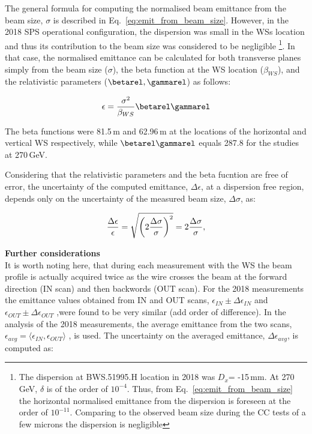 The general formula for computing the normalised beam emittance from the beam size, $\sigma$ is described in Eq.~\eqref{eq:emit_from_beam_size}. However, in the 2018 SPS operational configuration, the dispersion was small in the WSs location and thus its contribution to the beam size was considered to be negligible \footnote{The dispersion at BWS.51995.H location in 2018 was $D_x$= -15\,mm. At 270\,GeV, $\delta$ is of the order of $\mathrm{10^{-4}}$. Thus, from Eq.~\eqref{eq:emit_from_beam_size} the horizontal normalised emittance from the dispersion is foreseen at the order of $\mathrm{10^{-11}}$. Comparing to the observed beam size during the CC tests of a few microns the dispersion is negligible}. In that case, the normalised emittance can be calculated for both transverse planes simply from the beam size ($\sigma$), the beta function at the WS location ($\beta_{WS}$), and the relativistic parameters ($\betarel, \gammarel$) as follows:

\begin{equation}\label{eq:emittance_from_WS}
   \centering
   \epsilon = \frac{\sigma^2}{\beta_{WS}} \betarel \gammarel
\end{equation}

The beta functions were 81.5\,m and 62.96\,m at the locations of the horizontal and vertical WS respectively, while $\betarel \gammarel$ equals 287.8 for the studies at 270\,GeV.

Considering that the relativistic parameters and the beta fucntion are free of error, the uncertainty of the computed emittance, $\Delta \epsilon$, at a dispersion free region, depends only on the uncertainty of the measured beam size, $\Delta \sigma$, as:

\begin{equation}\label{eq:emittance_from_WS_uncertainty}
   \centering
   \frac{\Delta \epsilon}{\epsilon} = \sqrt{\left(2\frac{\Delta \sigma}{\sigma} \right)^2} = 2\frac{\Delta \sigma}{\sigma},
\end{equation}


\normalsize{\textbf{Further considerations}}\\
It is worth noting here, that during each measurement with the WS the beam profile is actually acquired twice as the wire crosses the beam at the forward direction (IN scan) and then backwords (OUT scan). For the 2018 measurements the emittance values obtained from IN and OUT scans, $\epsilon_{IN} \pm \Delta \epsilon_{IN}$ and $\epsilon_{OUT} \pm \Delta \epsilon_{OUT}$ ,were found to be very similar (add order of difference). In the analysis of the 2018 measurements, the average emittance from the two scans, $\epsilon_{avg} = \langle \epsilon_{IN}, \epsilon_{OUT}\rangle$ , is used. The uncertainty on the averaged emittance, $\Delta \epsilon_{avg}$, is computed as:

